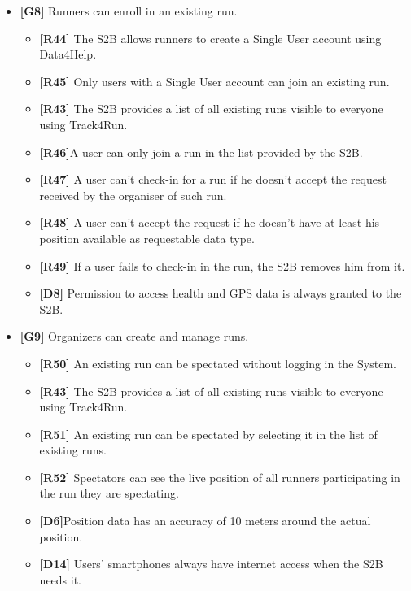 \documentclass[titlepage]{article}
\begin{document}
\begin{itemize}
\begin{itemize}
					\end{itemize}
					
					\item {\bf [G8]}  Runners can enroll in an existing run.
				 
					 \begin{itemize} %
					 	\item {\bf [R44]} The S2B allows runners to create a Single User account using Data4Help.
\item {\bf [R45]} Only users with a Single User account can join an existing run.
\item {\bf [R43]} The S2B provides a list of all existing runs visible to everyone using Track4Run.
\item {\bf [R46]}A user can only join a run in the list provided by the S2B.
\item {\bf [R47]} A user can’t check-in for a run if he doesn’t accept the request received by the organiser of such run.
\item {\bf [R48]} A user can’t accept the request if he doesn’t have at least his position available as requestable data type.
\item {\bf [R49]} If a user fails to check-in in the run, the S2B removes him from it.
\item {\bf [D8]} Permission to access health and GPS data is always granted to the S2B.

					\end{itemize}
					
					\item {\bf [G9]}  Organizers can create and manage runs.
				 
					 \begin{itemize} %
					 	\item {\bf [R50]} An existing run can be spectated without logging in the System.
\item {\bf [R43]} The S2B provides a list of all existing runs visible to everyone using Track4Run.
\item {\bf [R51]} An existing run can be spectated by selecting it in the list of existing runs.
\item {\bf [R52]} Spectators can see the live position of all runners participating in the run they are spectating.
\item {\bf [D6]}Position data has an accuracy of 10 meters around the actual position.
\item {\bf [D14]} Users’ smartphones always have internet access when the S2B needs it.
					\end{itemize}
				 
			\end{itemize}
			
\end{document}
